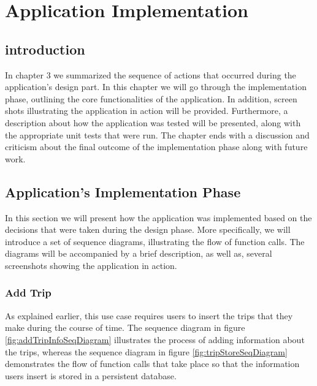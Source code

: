 
\chapter{Application Implementation} %
\label{Application Implementationn}

\section{introduction}

In chapter 3 we summarized the sequence of actions that occurred during the application's design part. In this chapter we will go through the implementation phase, outlining the core functionalities of the application. In addition, screen shots illustrating the application in action will be provided. Furthermore, a description about how the application was tested will be presented, along with the appropriate unit tests that were run. The chapter ends with a discussion and criticism about the final outcome of the implementation phase along with future work.

\section{Application's Implementation Phase}

In this section we will present how the application was implemented based on the decisions that were taken during the design phase. More specifically, we will introduce a set of sequence diagrams, illustrating the flow of function calls. The diagrams will be accompanied by a brief description, as well as, several screenshots showing the application in action.

\subsection{Add Trip}

As explained earlier, this use case requires users to insert the trips that they make during the course of time. The sequence diagram in figure \ref{fig:addTripInfoSeqDiagram} illustrates the process of adding information about the trips, whereas the sequence diagram in figure \ref{fig:tripStoreSeqDiagram} demonstrates the flow of function calls that take place so that the information users insert is stored in a persistent database.

